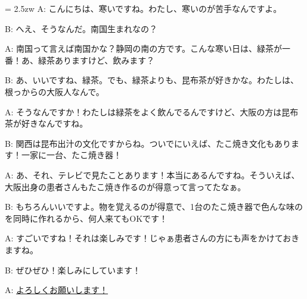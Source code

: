 \documentclass[11pt]{amsart}
\title{}
\author{}
\newenvironment{hangall}[1]{\hangindent = 2.5zw\everypar{\hangindent = 2.5zw}}{}
\begin{document}
\maketitle
\begin{hangall}{}%
A: こんにちは、寒いですね。わたし、寒いのが苦手なんですよ。

B: へえ、そうなんだ。南国生まれなの？

A: 南国って言えば南国かな？静岡の南の方です。こんな寒い日は、緑茶が一番！あ、緑茶ありますけど、飲みます？

B: あ、いいですね、緑茶。でも、緑茶よりも、昆布茶が好きかな。わたしは、根っからの大阪人なんで。

A: そうなんですか！わたしは緑茶をよく飲んでるんですけど、大阪の方は昆布茶が好きなんですね。

B: 関西は昆布出汁の文化ですからね。ついでにいえば、たこ焼き文化もあります！一家に一台、たこ焼き器！

A: あ、それ、テレビで見たことあります！本当にあるんですね。そういえば、大阪出身の患者さんもたこ焼き作るのが得意って言ってたなぁ。

B: もちろんいいですよ。物を覚えるのが得意で、1台のたこ焼き器で色んな味のを同時に作れるから、何人来てもOKです！

A: すごいですね！それは楽しみです！じゃぁ患者さんの方にも声をかけておきますね。

B: ぜひぜひ！楽しみにしています！

A: \ul{よろしくお願いします！}\end{hangall}
\end{document}
